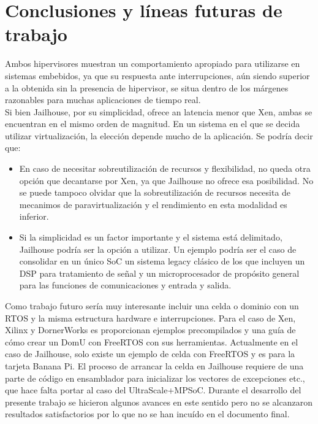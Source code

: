 \chapter{Conclusiones y líneas futuras de trabajo}

Ambos hipervisores muestran un comportamiento apropiado para utilizarse en sistemas embebidos, ya que su respuesta ante interrupciones, aún siendo superior a la obtenida sin la presencia de hipervisor, se situa dentro de los márgenes razonables para muchas aplicaciones de tiempo real.\\

Si bien Jailhouse, por su simplicidad, ofrece an latencia menor que Xen, ambas se encuentran en el mismo orden de magnitud. En un sistema en el que se decida utilizar virtualización, la elección depende mucho de la aplicación. Se podría decir que:

\begin{itemize}
  \item En caso de necesitar sobreutilización de recursos y flexibilidad, no queda otra opción que decantarse por Xen, ya que Jailhouse no ofrece esa posibilidad. No se puede tampoco olvidar que la sobreutilización de recursos necesita de mecanimos de paravirtualización y el rendimiento en esta modalidad es inferior.

 \item Si la simplicidad es un factor importante y el sistema está delimitado, Jailhouse podría ser la opción a utilizar. Un ejemplo podría ser el caso de consolidar en un único \acrshort{SoC} un sistema legacy clásico de los que incluyen un \acrshort{DSP} para tratamiento de señal y un microprocesador de propósito general para las funciones de comunicaciones y entrada y salida.

\end{itemize}

Como trabajo futuro sería muy interesante incluir una celda o dominio con un \acrshort{RTOS} y la misma estructura hardware e interrupciones. Para el caso de Xen, Xilinx y DornerWorks es proporcionan ejemplos precompilados y una guía de cómo crear un DomU con FreeRTOS con sus herramientas. Actualmente en el caso de Jailhouse, solo existe un ejemplo de celda con FreeRTOS y es para la tarjeta Banana Pi. El proceso de arrancar la celda en Jailhouse requiere de una parte de código en ensamblador para inicializar los vectores de excepciones etc., que hace falta portar al caso del UltraScale+\texttrademark MPSoC. Durante el desarrollo del presente trabajo se hicieron algunos avances en este sentido pero no se alcanzaron resultados satisfactorios por lo que no se han incuído en el documento final.

